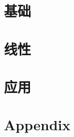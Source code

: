 \documentclass[UTF8]{book}
\begin{document}
	\begin{sloppypar}
		\frontmatter
		
		\thispagestyle{plain}
		\tableofcontents
		\newpage 
		\setlength{\baselineskip}{22pt}
		\pagestyle{headings}
		\mainmatter
		\part{基础}
			
			
			
			
			
			
		\part{线性}
			
			
			
			
		\part{应用}
			
			
			
		\appendix
		\part{Appendix}
			
			
			
	\end{sloppypar}
\end{document}
